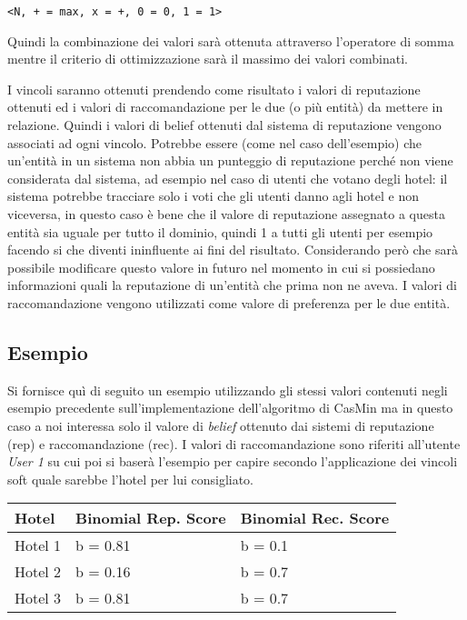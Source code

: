 \documentclass{report}
\begin{document}
	\texttt{\textless{}N,\ +\ =\ max,\ x\ =\ +,\ 0\ =\ 0,\ 1\ =\ 1\textgreater{}}
	
	Quindi la combinazione dei valori sarà ottenuta attraverso l'operatore
	di somma mentre il criterio di ottimizzazione sarà il massimo dei valori
	combinati.
	
	I vincoli saranno ottenuti prendendo come risultato i valori di
	reputazione ottenuti ed i valori di raccomandazione per le due (o più
	entità) da mettere in relazione. Quindi i valori di belief ottenuti dal
	sistema di reputazione vengono associati ad ogni vincolo. Potrebbe
	essere (come nel caso dell'esempio) che un'entità in un sistema non
	abbia un punteggio di reputazione perché non viene considerata dal
	sistema, ad esempio nel caso di utenti che votano degli hotel: il
	sistema potrebbe tracciare solo i voti che gli utenti danno agli hotel e
	non viceversa, in questo caso è bene che il valore di reputazione
	assegnato a questa entità sia uguale per tutto il dominio, quindi 1 a
	tutti gli utenti per esempio facendo si che diventi ininfluente ai fini
	del risultato. Considerando però che sarà possibile modificare questo
	valore in futuro nel momento in cui si possiedano informazioni quali la
	reputazione di un'entità che prima non ne aveva. I valori di
	raccomandazione vengono utilizzati come valore di preferenza per le due
	entità.
	
	\hypertarget{header-n241}{%
		\subsection{Esempio}\label{header-n241}}
	
	Si fornisce quì di seguito un esempio utilizzando gli stessi valori
	contenuti negli esempio precedente sull'implementazione dell'algoritmo
	di CasMin ma in questo caso a noi interessa solo il valore di
	\emph{belief} ottenuto dai sistemi di reputazione (rep) e
	raccomandazione (rec). I valori di raccomandazione sono riferiti
	all'utente \emph{User 1} su cui poi si baserà l'esempio per capire
	secondo l'applicazione dei vincoli soft quale sarebbe l'hotel per lui
	consigliato.
	
	\begin{longtable}[]{@{}lll@{}}
		\toprule
		Hotel & Binomial Rep. Score & Binomial Rec. Score\tabularnewline
		\midrule
		\endhead
		Hotel 1 & b = 0.81 & b = 0.1\tabularnewline
		Hotel 2 & b = 0.16 & b = 0.7\tabularnewline
		Hotel 3 & b = 0.81 & b = 0.7\tabularnewline
		\bottomrule
	\end{longtable}
	
\end{document}
